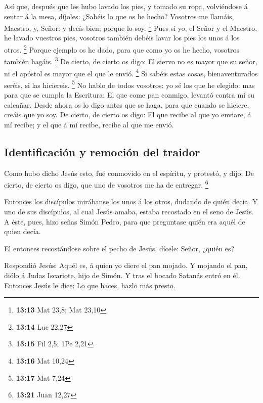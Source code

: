  Así que, después que les hubo lavado los pies, y tomado su
ropa, volviéndose á sentar á la mesa, díjoles: ¿Sabéis lo que os he
hecho?  Vosotros me llamáis, Maestro, y, Señor: y decís
bien; porque lo soy. \footnote{\textbf{13:13} Mat 23,8; Mat 23,10}
 Pues si yo, el Señor y el Maestro, he lavado vuestros
pies, vosotros también debéis lavar los pies los unos á los otros.
\footnote{\textbf{13:14} Luc 22,27}  Porque ejemplo os he
dado, para que como yo os he hecho, vosotros también hagáis. \footnote{\textbf{13:15}
  Fil 2,5; 1Pe 2,21}  De cierto, de cierto os digo: El
siervo no es mayor que su señor, ni el apóstol es mayor que el que le
envió. \footnote{\textbf{13:16} Mat 10,24}  Si sabéis estas
cosas, bienaventurados seréis, si las hiciereis. \footnote{\textbf{13:17}
  Mat 7,24}  No hablo de todos vosotros: yo sé los que he
elegido: mas para que se cumpla la Escritura: El que come pan conmigo,
levantó contra mí su calcañar.  Desde ahora os lo digo
antes que se haga, para que cuando se hiciere, creáis que yo soy.
 De cierto, de cierto os digo: El que recibe al que yo
enviare, á mí recibe; y el que á mí recibe, recibe al que me envió.

\hypertarget{identificaciuxf3n-y-remociuxf3n-del-traidor}{%
\subsection{Identificación y remoción del
traidor}\label{identificaciuxf3n-y-remociuxf3n-del-traidor}}

 Como hubo dicho Jesús esto, fué conmovido en el espíritu,
y protestó, y dijo: De cierto, de cierto os digo, que uno de vosotros me
ha de entregar. \footnote{\textbf{13:21} Juan 12,27}

 Entonces los discípulos mirábanse los unos á los otros,
dudando de quién decía.  Y uno de sus discípulos, al cual
Jesús amaba, estaba recostado en el seno de Jesús.  A éste,
pues, hizo señas Simón Pedro, para que preguntase quién era aquél de
quien decía.

 El entonces recostándose sobre el pecho de Jesús, dícele:
Señor, ¿quién es?

 Respondió Jesús: Aquél es, á quien yo diere el pan mojado.
Y mojando el pan, diólo á Judas Iscariote, hijo de Simón. 
Y tras el bocado Satanás entró en él. Entonces Jesús le dice: Lo que
haces, hazlo más presto.

